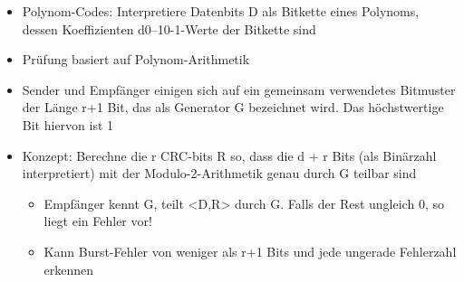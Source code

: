 \begin{itemize}
    \item Polynom-Codes: Interpretiere Datenbits D als Bitkette eines Polynoms, dessen Koeffizienten d0--10-1-Werte der Bitkette sind
    \item Prüfung basiert auf Polynom-Arithmetik
    \item Sender und Empfänger einigen sich auf ein gemeinsam verwendetes Bitmuster der Länge r+1 Bit, das als Generator G bezeichnet wird. Das höchstwertige Bit hiervon ist 1
    \item Konzept: Berechne die r CRC-bits R so, dass die d + r Bits (als Binärzahl interpretiert) mit der Modulo-2-Arithmetik genau durch G teilbar sind
    \begin{itemize}
        \item Empfänger kennt G, teilt <D,R> durch G. Falls der Rest ungleich 0, so liegt ein Fehler vor!
        \item Kann Burst-Fehler von weniger als r+1 Bits und jede ungerade Fehlerzahl erkennen
    \end{itemize}
\end{itemize}

